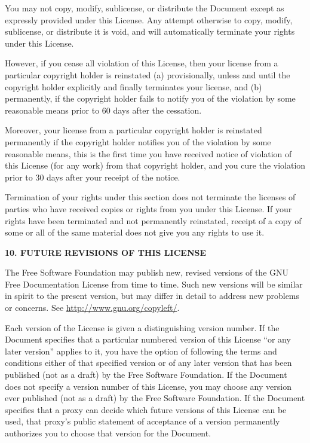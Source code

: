 \documentclass{book}
\begin{document}
You may not copy, modify, sublicense, or distribute the Document
except as expressly provided under this License.  Any attempt
otherwise to copy, modify, sublicense, or distribute it is void, and
will automatically terminate your rights under this License.

However, if you cease all violation of this License, then your license
from a particular copyright holder is reinstated (a) provisionally,
unless and until the copyright holder explicitly and finally
terminates your license, and (b) permanently, if the copyright holder
fails to notify you of the violation by some reasonable means prior to
60 days after the cessation.

Moreover, your license from a particular copyright holder is
reinstated permanently if the copyright holder notifies you of the
violation by some reasonable means, this is the first time you have
received notice of violation of this License (for any work) from that
copyright holder, and you cure the violation prior to 30 days after
your receipt of the notice.

Termination of your rights under this section does not terminate the
licenses of parties who have received copies or rights from you under
this License.  If your rights have been terminated and not permanently
reinstated, receipt of a copy of some or all of the same material does
not give you any rights to use it.

\begin{center}
{\Large\bf 10. FUTURE REVISIONS OF THIS LICENSE\par}
\end{center}

The Free Software Foundation may publish new, revised versions
of the GNU Free Documentation License from time to time.  Such new
versions will be similar in spirit to the present version, but may
differ in detail to address new problems or concerns.  See
\url{http://www.gnu.org/copyleft/}.

Each version of the License is given a distinguishing version number.
If the Document specifies that a particular numbered version of this
License ``or any later version'' applies to it, you have the option of
following the terms and conditions either of that specified version or
of any later version that has been published (not as a draft) by the
Free Software Foundation.  If the Document does not specify a version
number of this License, you may choose any version ever published (not
as a draft) by the Free Software Foundation.  If the Document
specifies that a proxy can decide which future versions of this
License can be used, that proxy's public statement of acceptance of a
version permanently authorizes you to choose that version for the
Document.
\end{document}
